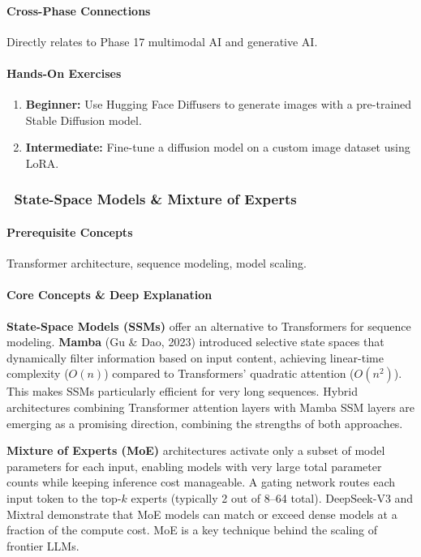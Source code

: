 \documentclass[11pt, a4paper, oneside]{report}
\newcommand{\awareness}[1]{\subsubsection{\texorpdfstring{\fcolorbox{gray!50}{gray!10}{\footnotesize\bfseries\color{gray!50!black} AWARENESS}~#1}{#1}}}
\begin{document}
\paragraph{Cross-Phase Connections} Directly relates to Phase 17 multimodal AI and generative AI.

\paragraph{Hands-On Exercises}
\begin{enumerate}[leftmargin=*]
\item \textbf{Beginner:} Use Hugging Face Diffusers to generate images with a pre-trained Stable Diffusion model.
\item \textbf{Intermediate:} Fine-tune a diffusion model on a custom image dataset using LoRA.
\end{enumerate}

\awareness{State-Space Models \& Mixture of Experts}

\paragraph{Prerequisite Concepts} Transformer architecture, sequence modeling, model scaling.

\paragraph{Core Concepts \& Deep Explanation} \textbf{State-Space Models (SSMs)} offer an alternative to Transformers for sequence modeling. \textbf{Mamba} (Gu \& Dao, 2023) introduced selective state spaces that dynamically filter information based on input content, achieving linear-time complexity ($O(n)$) compared to Transformers' quadratic attention ($O(n^2)$). This makes SSMs particularly efficient for very long sequences. Hybrid architectures combining Transformer attention layers with Mamba SSM layers are emerging as a promising direction, combining the strengths of both approaches.

\textbf{Mixture of Experts (MoE)} architectures activate only a subset of model parameters for each input, enabling models with very large total parameter counts while keeping inference cost manageable. A gating network routes each input token to the top-$k$ experts (typically 2 out of 8--64 total). DeepSeek-V3 and Mixtral demonstrate that MoE models can match or exceed dense models at a fraction of the compute cost. MoE is a key technique behind the scaling of frontier LLMs.
\end{document}
